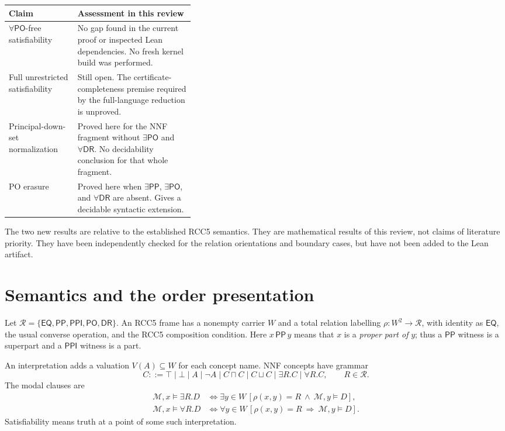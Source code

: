 \documentclass[11pt,letterpaper]{article}
\newcommand{\EQ}{\mathsf{EQ}}
\newcommand{\PP}{\mathsf{PP}}
\newcommand{\PPI}{\mathsf{PPI}}
\newcommand{\PO}{\mathsf{PO}}
\newcommand{\DR}{\mathsf{DR}}
\newcommand{\Rel}{\mathcal R}
\theoremstyle{definition}
\theoremstyle{remark}
\begin{document}
\begin{center}
\small
\begin{tabularx}{\linewidth}{@{}p{0.37\linewidth}Y@{}}
\toprule
Claim & Assessment in this review\\
\midrule
$\forall\PO$-free satisfiability & No gap found in the current proof or
inspected Lean dependencies. No fresh kernel build was performed.\\
Full unrestricted satisfiability & Still open. The certificate-completeness
premise required by the full-language reduction is unproved.\\
Principal-down-set normalization & Proved here for the NNF fragment
without $\exists\PO$ and $\forall\DR$. No decidability conclusion for
that whole fragment.\\
PO erasure & Proved here when $\exists\PP$, $\exists\PO$, and
$\forall\DR$ are absent. Gives a decidable syntactic extension.\\
\bottomrule
\end{tabularx}
\end{center}

The two new results are relative to the established RCC5 semantics. They
are mathematical results of this review, not claims of literature priority.
They have been independently checked for the relation orientations and
boundary cases, but have not been added to the Lean artifact.

\section{Semantics and the order presentation}
\label{sec:semantics}

Let $\Rel=\{\EQ,\PP,\PPI,\PO,\DR\}$. An RCC5 frame has a nonempty
carrier $W$ and a total relation labelling $\rho:W^2\to\Rel$, with
identity as $\EQ$, the usual converse operation, and the RCC5 composition
condition. Here $x\,\PP\,y$ means that $x$ is a \emph{proper part of}
$y$; thus a $\PP$ witness is a superpart and a $\PPI$ witness is a part.

An interpretation adds a valuation $V(A)\subseteq W$ for each concept name.
NNF concepts have grammar
\[
C ::= \top\mid\bot\mid A\mid\neg A\mid C\sqcap C\mid C\sqcup C
       \mid\exists R.C\mid\forall R.C,\qquad R\in\Rel.
\]
The modal clauses are
\begin{align*}
\mathcal M,x\models\exists R.D
 &\iff \exists y\in W\,[\rho(x,y)=R\ \land\ \mathcal M,y\models D],\\
\mathcal M,x\models\forall R.D
 &\iff \forall y\in W\,[\rho(x,y)=R\ \Longrightarrow\ \mathcal M,y\models D].
\end{align*}
Satisfiability means truth at a point of some such interpretation.
\end{document}
